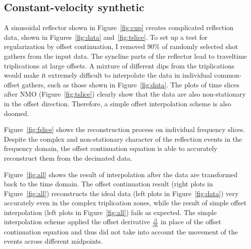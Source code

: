 \subsection{Constant-velocity synthetic}



A sinusoidal reflector shown in Figure~\ref{fig:cup} creates
complicated reflection data, shown in Figures~\ref{fig:data}
and~\ref{fig:tslice}. To set up a test for regularization by offset
continuation, I removed 90\% of randomly selected shot gathers from
the input data.  The syncline parts of the reflector lead to
traveltime triplications at large offsets. A mixture of different dips
from the triplications would make it extremely difficult to
interpolate the data in individual common-offset gathers, such as
those shown in Figure~\ref{fig:data}.  The plots of time slices
after NMO (Figure~\ref{fig:tslice}) clearly show that the data are
also non-stationary in the offset direction.  Therefore, a simple
offset interpolation scheme is also doomed.



\par
Figure~\ref{fig:fslice} shows the reconstruction process on individual
frequency slices. Despite the complex and non-stationary character of
the reflection events in the frequency domain, the offset continuation
equation is able to accurately reconstruct them from the decimated
data.


\par
Figure~\ref{fig:all} shows the result of interpolation after the data
are transformed back to the time domain. The offset continuation
result (right plots in Figure~\ref{fig:all}) reconstructs the ideal
data (left plots in Figure~\ref{fig:data}) very accurately even in
the complex triplication zones, while the result of simple offset
interpolation (left plots in Figure~\ref{fig:all}) fails as expected.
The simple interpolation scheme applied the offset derivative 
$\frac{\partial}{\partial h}$
in place of the offset continuation equation and thus did not take
into account the movement of the events across different midpoints.

